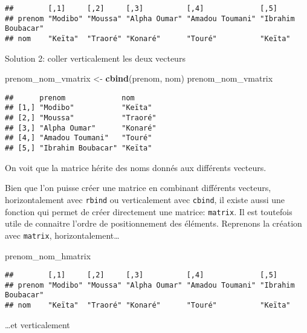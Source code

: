 \documentclass[]{book}
\newenvironment{Shaded}{\begin{snugshade}}{\end{snugshade}}
\newcommand{\KeywordTok}[1]{\textcolor[rgb]{0.13,0.29,0.53}{\textbf{#1}}}
\newcommand{\StringTok}[1]{\textcolor[rgb]{0.31,0.60,0.02}{#1}}
\newcommand{\NormalTok}[1]{#1}
\begin{document}
\begin{verbatim}
##        [,1]     [,2]     [,3]          [,4]             [,5]              
## prenom "Modibo" "Moussa" "Alpha Oumar" "Amadou Toumani" "Ibrahim Boubacar"
## nom    "Keïta"  "Traoré" "Konaré"      "Touré"          "Keïta"
\end{verbatim}

Solution 2: coller verticalement les deux vecteurs

\begin{Shaded}
\begin{Highlighting}[]
\NormalTok{prenom_nom_vmatrix <-}\StringTok{ }\KeywordTok{cbind}\NormalTok{(prenom, nom)}
\NormalTok{prenom_nom_vmatrix}
\end{Highlighting}
\end{Shaded}

\begin{verbatim}
##      prenom             nom     
## [1,] "Modibo"           "Keïta" 
## [2,] "Moussa"           "Traoré"
## [3,] "Alpha Oumar"      "Konaré"
## [4,] "Amadou Toumani"   "Touré" 
## [5,] "Ibrahim Boubacar" "Keïta"
\end{verbatim}

On voit que la matrice hérite des noms donnés aux différents vecteurs.

Bien que l'on puisse créer une matrice en combinant différents vecteurs,
horizontalement avec \texttt{rbind} ou verticalement avec
\texttt{cbind}, il existe aussi une fonction qui permet de créer
directement une matrice: \texttt{matrix}. Il est toutefois utile de
connaitre l'ordre de positionnement des éléments. Reprenons la création
avec \texttt{matrix}, horizontalement\ldots{}

\begin{Shaded}
\begin{Highlighting}[]
\NormalTok{prenom_nom_hmatrix}
\end{Highlighting}
\end{Shaded}

\begin{verbatim}
##        [,1]     [,2]     [,3]          [,4]             [,5]              
## prenom "Modibo" "Moussa" "Alpha Oumar" "Amadou Toumani" "Ibrahim Boubacar"
## nom    "Keïta"  "Traoré" "Konaré"      "Touré"          "Keïta"
\end{verbatim}

\ldots{}et verticalement
\end{document}
